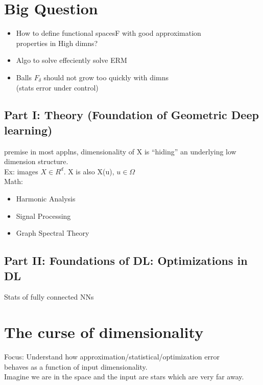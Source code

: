 \documentclass[11pt]{article}
\begin{document}
\section{Big Question}
\label{sec:org52acc5c}
\begin{itemize}
\item How to define functional spacesF with good approximation\\
properties in High dimns?\\
\item Algo to solve effeciently solve ERM\\
\item Balls \(F_\delta\) should not grow too quickly with dimns\\
(stats error under control)\\
\end{itemize}
\subsection{Part I: Theory (Foundation of Geometric Deep learning)}
\label{sec:orge36a889}
premise in most applns, dimensionality of X is ``hiding'' an underlying low\\
dimension structure.\\
Ex: images \(X \in R^d\). X is also X(u), \(u \in \Omega\)\\
Math:\\
\begin{itemize}
\item Harmonic Analysis\\
\item Signal Processing\\
\item Graph Spectral Theory\\
\end{itemize}
\subsection{Part II: Foundations of DL: Optimizations in DL}
\label{sec:org11eec4d}
Stats of fully connected NNs\\
\section{The curse of dimensionality}
\label{sec:org3132d6f}
Focus: Understand how approximation/statistical/optimization error\\
behaves as a function of input dimensionality.\\
Imagine we are in the space and the input are stars which are very far away.\\
\end{document}
